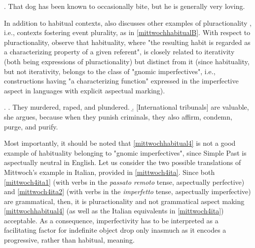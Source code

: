 \ex. \label{goldz} That dog has been known to occasionally bite, but he is generally very loving.  

In addition to habitual contexts, \textcite[248]{Mittwoch2005} also discusses other examples of pluractionality \parencite{lasersohn1995plurality2013}, i.e., contexts fostering event plurality, as in \ref{mittwochhabitualB}. With respect to pluractionality, \textcite{BertinettoLenci2012habituality} observe that habituality, where "the resulting habit is regarded as a characterizing property of a given referent", is closely related to iterativity (both being expressions of pluractionality) but distinct from it (since habituality, but not iterativity, belongs to the class of "gnomic imperfectives", i.e., constructions having "a characterizing function" expressed in the imperfective aspect in languages with explicit aspectual marking).

\ex. \label{mittwochhabitualB} \a. \label{mittwochhabitual4} They murdered, raped, and plundered.
\b. \label{mittwochhabitual5} [International tribunals] are valuable, she argues, because when they punish criminals, they also affirm, condemn, purge, and purify.

Most importantly, it should be noted that \ref{mittwochhabitual4} is not a good example of habituality belonging to "gnomic imperfectives", since Simple Past is aspectually neutral in English. Let us consider the two possible translations of Mittwoch's example in Italian, provided in \ref{mittwoch4ita}. Since both \ref{mittwoch4ita1} (with verbs in the \textit{passato remoto} tense, aspectually perfective) and \ref{mittwoch4ita2} (with verbs in the \textit{imperfetto} tense, aspectually imperfective) are grammatical, then, it is pluractionality and not grammatical aspect making \ref{mittwochhabitual4} (as well as the Italian equivalents in \ref{mittwoch4ita}) acceptable. As a consequence, imperfectivity has to be interpreted as a facilitating factor for indefinite object drop only inasmuch as it encodes a progressive, rather than habitual, meaning.

